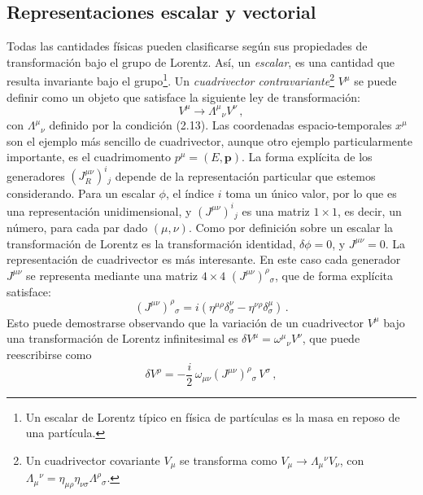 \documentclass[a4paper,11pt]{book} %
\begin{document}
\subsection{Representaciones escalar y vectorial}
\noindent
Todas las cantidades físicas pueden clasificarse según sus propiedades de transformación bajo el grupo de Lorentz. Así, un \textit{escalar}, es una cantidad que resulta invariante bajo el grupo\footnote{Un escalar de Lorentz típico en física de partículas es la masa en reposo de una partícula.}. Un \textit{cuadrivector contravariante}\footnote{Un cuadrivector covariante $V_\mu$ se transforma como $V_\mu \to \Lambda_\mu{}^\nu V_\nu$, con $\Lambda_\mu{}^\nu = \eta_{\mu\rho}\eta_{\nu\sigma}\Lambda^\rho{}_\sigma$.} $V^\mu$ se puede definir como un objeto que satisface la siguiente ley de transformación:
\begin{equation}
    V^\mu \to \Lambda^\mu{}_\nu V^\nu\,,
\end{equation}
con $\Lambda^\mu{}_\nu$ definido por la condición (2.13). Las coordenadas espacio-temporales $x^\mu$ son el ejemplo más sencillo de cuadrivector, aunque otro ejemplo particularmente importante, es el cuadrimomento $p^\mu = (E, \mathbf{p})$.
 \medskip\newline
La forma explícita de los generadores $(J^{\mu\nu}_R)^i{}_j$ depende de la representación particular que estemos considerando. 
\medskip\newline
Para un escalar $\phi$, el índice $i$ toma un único valor, por lo que es una representación unidimensional, y $(J^{\mu\nu})^i{}_j$ es una matriz $1\times1$, es decir, un número, para cada par dado $(\mu,\nu)$. Como por definición sobre un escalar la transformación de Lorentz es la transformación identidad, $\delta\phi = 0$, y $J^{\mu\nu} = 0$. 
\newpage\noindent
La representación de cuadrivector es más interesante. En este caso cada generador $J^{\mu\nu}$ se representa mediante una matriz $4\times4$ $(J^{\mu\nu})^\rho{}_\sigma$, que de forma explícita satisface:
\begin{equation}
    (J^{\mu\nu})^\rho{}_\sigma = i\left(\eta^{\mu\rho}\delta^\nu_\sigma - \eta^{\nu\rho}\delta^\mu_\sigma\right)\,.
\end{equation}
Esto puede demostrarse observando que la variación de un cuadrivector $V^\mu$ bajo una transformación de Lorentz infinitesimal es $\delta V^\mu = \omega^\mu{}_\nu V^\nu$, que puede reescribirse como
\begin{equation}
    \delta V^\rho = -\frac{i}{2}\,\omega_{\mu\nu}(J^{\mu\nu})^\rho{}_\sigma\,V^\sigma\,,
\end{equation}
\end{document}
